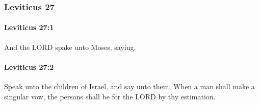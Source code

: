 	\subsubsection{Leviticus 27} %
		\label{LEVITICUS-27}

		\paragraph{Leviticus 27:1} %
			\label{LEVITICUS-27-1}

			And the LORD spake unto Moses, saying,


		\paragraph{Leviticus 27:2} %
			\label{LEVITICUS-27-2}

			Speak unto the children of Israel, and say unto them, When a man shall make a singular vow, the persons shall be for the LORD by thy estimation.

